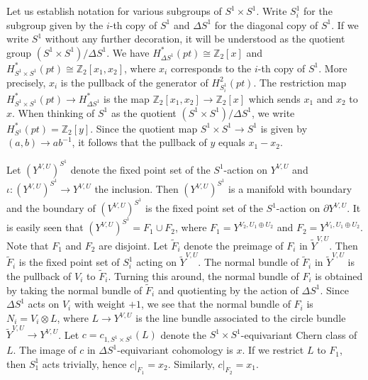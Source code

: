 \documentclass{amsart}
\theoremstyle{definition}
\theoremstyle{remark}
\numberwithin{equation}{section}
\begin{document}
Let us establish notation for various subgroups of $S^1 \times S^1$. Write $S^1_i$ for the subgroup given by the $i$-th copy of $S^1$ and $\Delta S^1$ for the diagonal copy of $S^1$. If we write $S^1$ without any further decoration, it will be understood as the quotient group $(S^1 \times S^1)/\Delta S^1$. We have $H^*_{\Delta S^1}(pt) \cong \mathbb{Z}_2[x]$ and $H^*_{S^1 \times S^1}(pt) \cong \mathbb{Z}_2[x_1,x_2]$, where $x_i$ corresponds to the $i$-th copy of $S^1$. More precisely, $x_i$ is the pullback of the generator of $H^2_{S^1_i}(pt)$. The restriction map $H^*_{S^1 \times S^1}(pt) \to H^*_{\Delta S^1}$ is the map $\mathbb{Z}_2[x_1,x_2] \to \mathbb{Z}_2[x]$ which sends $x_1$ and $x_2$ to $x$. When thinking of $S^1$ as the quotient $(S^1 \times S^1)/\Delta S^1$, we write $H^*_{S^1}(pt) = \mathbb{Z}_2[y]$. Since the quotient map $S^1 \times S^1 \to S^1$ is given by $(a,b) \to ab^{-1}$, it follows that the pullback of $y$ equals $x_1 - x_2$.

Let $(Y^{V,U})^{S^1}$ denote the fixed point set of the $S^1$-action on $Y^{V,U}$ and $\iota : (Y^{V,U})^{S^1} \to Y^{V,U}$ the inclusion. Then $(Y^{V,U})^{S^1}$ is a manifold with boundary and the boundary of $(V^{V,U})^{S^1}$ is the fixed point set of the $S^1$-action on $\partial Y^{V,U}$. It is easily seen that $(Y^{V,U})^{S^1} = F_1 \cup F_2$, where $F_1 = Y^{V_2 , U_1 \oplus U_2}$ and $F_2 = Y^{V_1 , U_1 \oplus U_2}$. Note that $F_1$ and $F_2$ are disjoint. Let $\widetilde{F}_i$ denote the preimage of $F_i$ in $\widetilde{Y}^{V,U}$. Then $\widetilde{F}_i$ is the fixed point set of $S^1_i$ acting on $\widetilde{Y}^{V,U}$. The normal bundle of $\widetilde{F}_i$ in $\widetilde{Y}^{V,U}$ is the pullback of $V_i$ to $\widetilde{F}_i$. Turning this around, the normal bundle of $F_i$ is obtained by taking the normal bundle of $\widetilde{F}_i$ and quotienting by the action of $\Delta S^1$. Since $\Delta S^1$ acts on $V_i$ with weight $+1$, we see that the normal bundle of $F_i$ is $N_i = V_i \otimes L$, where $L \to Y^{V,U}$ is the line bundle associated to the circle bundle $\widetilde{Y}^{V,U} \to Y^{V,U}$. Let $c = c_{1,S^1 \times S^1}(L)$ denote the $S^1 \times S^1$-equivariant Chern class of $L$. The image of $c$ in $\Delta S^1$-equivariant cohomology is $x$. If we restrict $L$ to $F_1$, then $S^1_1$ acts trivially, hence $c|_{F_1} = x_2$. Similarly, $c|_{F_2} = x_1$.
\end{document}
